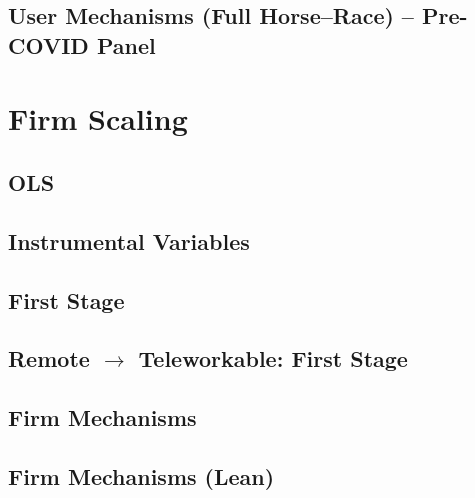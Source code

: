 \documentclass{article}
\newcommand{\cleanedresultsdir}{../results/cleaned}
\begin{document}
\clearpage
\begin{landscape}
\section{User Mechanisms (Full Horse–Race) – Pre-COVID Panel}

\end{landscape}


\clearpage
\section{Firm Scaling}

\subsection{OLS}


\subsection{Instrumental Variables}


\subsection{First Stage}


\subsection{Remote $\rightarrow$ Teleworkable: First Stage}


\clearpage
\begin{landscape}
\subsection{Firm Mechanisms}

\end{landscape}

\begin{landscape}
\subsection{Firm Mechanisms (Lean)}

\end{landscape}
\end{document}
